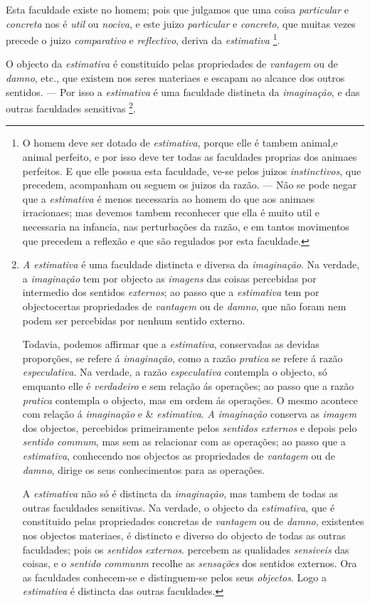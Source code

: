 Esta faculdade existe no homem; pois que julgamos que uma coisa \emph{particular} e \emph{concreta} nos é \emph{util} ou \emph{nociva}, e este juizo \emph{particular} e \emph{concreto}, que muitas vezes precede o juizo \emph{comparativo} e \emph{reflectivo}, deriva da \emph{estimativa} \footnote{O homem deve ser dotado de \emph{estimativa}, porque elle é tambem animal,e animal perfeito, e por isso deve ter todas as faculdades proprias dos animaes perfeitos. E que elle possua esta faculdade, ve-se pelos juizos \emph{instinctivos}, que precedem, acompanham ou seguem os juizos da razão. --- Não se pode negar que a \emph{estimativa} é menos necessaria ao homem do que aos animaes irracionaes; mas devemos tambem reconhecer que ella é muito util e necessaria na infancia, nas perturbações da razão, e em tantos movimentos que precedem a reflexão e que são regulados por esta faculdade.}.


O objecto da \emph{estimativa} é constituido pelas propriedades de \emph{vantagem} ou de \emph{damno}, etc., que existem nos seres materiaes e escapam ao alcance dos outros sentidos. --- Por isso a \emph{estimativa} é uma faculdade distineta da \emph{imaginação}, e das outras faculdades sensitivas \footnote{\emph{A estimativa} é uma faculdade distincta e diversa da \emph{imaginação}. Na verdade, a \emph{imaginação} tem por objecto as \emph{imagens} das coisas percebidas por intermedio dos sentidos \emph{externos}; ao passo que a \emph{estimativa} tem por objectocertas propriedades de \emph{vantagem} ou de \emph{damno}, que não foram nem podem ser percebidas por nenhum sentido externo.\par Todavia, podemos affirmar que a \emph{estimativa}, conservadas as devidas proporções, se refere á \emph{imaginação}, como a razão \emph{pratica} se refere á razão \emph{especulativa}. Na verdade, a razão \emph{especulativa} contempla o objecto, só emquanto elle é \emph{verdadeiro} e sem relação ás operações; ao passo que a razão \emph{pratica} contempla o objecto, mas em ordem ás operações. O mesmo acontece com relação á \emph{imaginação} e \& \emph{estimativa}. \emph{A imaginação} conserva as \emph{imagem} dos objectos, percebidos primeiramente pelos \emph{sentidos externos} e depois pelo \emph{sentido commum}, mas sem as relacionar com as operações; ao passo que a \emph{estimativa}, conhecendo nos objectos as propriedades de \emph{vantagem} ou de \emph{damno}, dirige os seus conhecimentos para as operações.\par A \emph{estimativa} não só é distincta da \emph{imaginação}, mas tambem de todas as outras faculdades sensitivas. Na verdade, o objecto da \emph{estimativa}, que é constituido pelas propriedades concretas de \emph{vantagem} ou de \emph{damno}, existentes nos objectos materiaes, é distincto e diverso do objecto de todas as outras faculdades; pois os \emph{sentidos externos}. percebem as qualidades \emph{sensiveis} das coisas, e o \emph{sentido communm} recolhe as \emph{sensações} dos sentidos externos. Ora as faculdades conhecem-se e distinguem-se pelos seus \emph{objectos}. Logo a \emph{estimativa} é distincta das outras faculdades.}.

